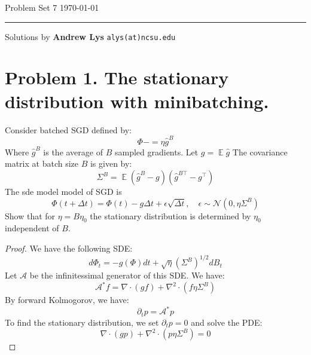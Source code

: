 \documentclass{amsart}
\newcommand{\cA}{\mathcal{A}}
\newcommand{\cN}{\mathcal{N}}
\DeclareMathOperator{\ee}{\mathbb{E}}
\theoremstyle{definition}
\begin{document}
\noindent
Problem Set 7  \hfill \today  %
\smallskip
\hrule
\smallskip
\noindent
Solutions by {\bf Andrew Lys} \qquad   %
  {\tt alys(at)ncsu.edu}

\vspace{0.5cm}

\section*{Problem 1. The stationary distribution with minibatching.}
Consider batched SGD defined by:
\[
\Phi -= \eta \hat{g}^B
\]
Where $\hat{g}^B$ is the average of $B$ sampled gradients. 
Let $g = \ee{\hat{g}}$
The covariance matrix at batch size $B$ is given by:
\[
\Sigma^B = \ee{(\hat{g}^B - g)(\hat{g}^{B\top} - g^\top)}
\]
The sde model model of SGD is 
\[
\Phi(t + \Delta t) = \Phi(t) - g\Delta t + \epsilon \sqrt{\Delta t}, \quad \epsilon \sim \cN(0, \eta \Sigma^B)
\]
Show that for $\eta = B \eta_0$ the stationary distribution is determined by $\eta_0$ independent of $B$. 
\begin{proof}
We have the following SDE:
\[
d \Phi_t = - g(\Phi) d t + \sqrt{\eta} (\Sigma^B)^{1/2} d B_t
\]
Let $\cA$ be the infinitessimal generator of this SDE. 
We have:
\[
\cA^\ast f =  \nabla \cdot (g f) + \nabla^2 \cdot (f \eta\Sigma^B)
\]
By forward Kolmogorov, we have:
\[
\partial_t p = \cA^\ast p 
\]
To find the stationary distribution, we set $\partial_t p = 0$ and solve the PDE:
\[
\nabla \cdot (g p) + \nabla^2 \cdot (p \eta\Sigma^B) = 0
\]
\end{proof}
\end{document}
